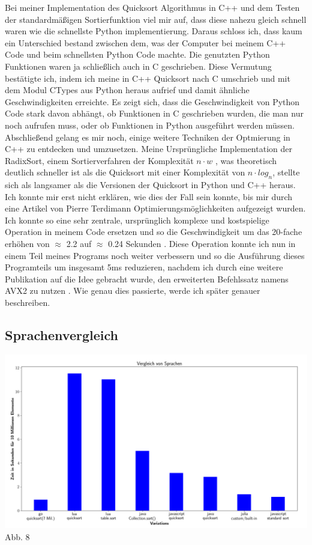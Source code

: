 \documentclass[12pt,a4paper]{article}
\begin{document}
Bei meiner Implementation des Quicksort Algorithmus in C++ und dem Testen der standardmäßigen Sortierfunktion
viel mir auf, dass diese nahezu gleich schnell waren wie die schnellste Python implementierung.
Daraus schloss ich, dass kaum ein Unterschied bestand zwischen dem, was der Computer bei meinem C++ Code und beim schnellsten Python Code machte.
Die genutzten Python Funktionen waren ja schließlich auch in C geschrieben. Diese Vermutung bestätigte ich, indem
ich meine in C++ Quicksort nach C umschrieb und mit dem Modul CTypes aus Python heraus aufrief und damit ähnliche Geschwindigkeiten
erreichte. Es zeigt sich, dass die Geschwindigkeit von Python Code stark davon abhängt, ob Funktionen in C geschrieben wurden,
die man nur noch aufrufen muss, oder ob Funktionen in Python ausgeführt werden müssen.
Abschließend gelang es mir noch, einige weitere Techniken der Optmierung in C++ zu entdecken und umzusetzen.
Meine Ursprüngliche Implementation der RadixSort, einem Sortierverfahren der Komplexität $n \cdot w$ , was theoretisch deutlich schneller ist als die Quicksort
mit einer Komplexität von $n \cdot log_{n}$, stellte sich als langsamer als die Versionen  der Quicksort in Python und C++ heraus.
Ich konnte mir erst nicht erklären, wie dies der Fall sein konnte, bis mir durch eine Artikel von Pierre Terdimann Optimierungsmöglichkeiten
aufgezeigt wurden. Ich konnte so eine sehr zentrale, ursprünglich komplexe und kostspielige Operation in meinem Code ersetzen
und so die Geschwindigkeit um das 20-fache erhöhen von $\approx$ 2.2 auf $\approx$ 0.24 Sekunden \cite{terdiman}.
Diese Operation konnte ich nun in einem Teil meines Programs noch weiter verbessern und so die Ausführung dieses Programteils
um insgesamt 5ms reduzieren, nachdem ich durch eine weitere Publikation auf die Idee gebracht wurde, den erweiterten Befehlssatz namens
AVX2 zu nutzen \cite{michael}. Wie genau dies passierte, werde ich später genauer beschreiben.

  \cite{intelavxdocs} 



\subsection{Sprachenvergleich}

\begin{center}
    \hspace*{-1.5cm}\includegraphics[width=1.2\textwidth]{./diagramme/matplotlib/comparison.png}
    Abb. 8
\end{center}
\end{document}
